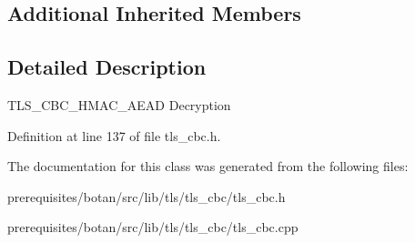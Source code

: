 \subsection*{Additional Inherited Members}


\subsection{Detailed Description}
T\+L\+S\+\_\+\+C\+B\+C\+\_\+\+H\+M\+A\+C\+\_\+\+A\+E\+AD Decryption 

Definition at line 137 of file tls\+\_\+cbc.\+h.



The documentation for this class was generated from the following files\+:\begin{DoxyCompactItemize}
\item 
prerequisites/botan/src/lib/tls/tls\+\_\+cbc/tls\+\_\+cbc.\+h\item 
prerequisites/botan/src/lib/tls/tls\+\_\+cbc/tls\+\_\+cbc.\+cpp\end{DoxyCompactItemize}
